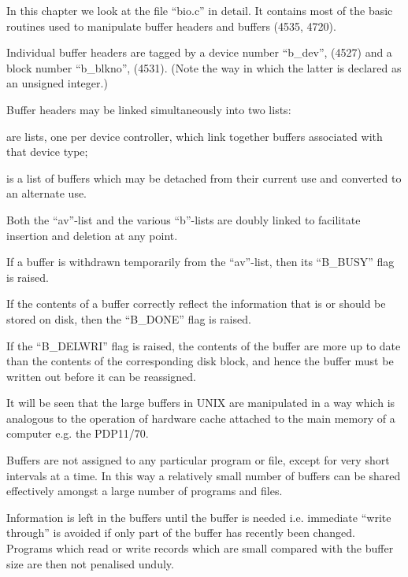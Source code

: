 %
%

In this chapter we look at the file
``bio.c'' in detail. It contains most of
the basic routines used to manipulate
buffer headers and buffers (4535,
4720).


Individual buffer headers are tagged by
a device number ``b\_dev'', (4527) and a
block number ``b\_blkno'', (4531). (Note
the way in which the latter is declared
as an unsigned integer.)

Buffer headers may be linked simultaneously into two lists:

\bd
\item[the ``b''-lists] are lists, one per
device controller, which link
together buffers associated with
that device type;

\item[the ``av''-list] is a list of buffers
which may be detached from their
current use and converted to an
alternate use.
\ed

Both the ``av''-list and the various
``b''-lists are doubly linked to facilitate insertion and deletion at any
point.


If a buffer is withdrawn temporarily
from the ``av''-list, then its ``B\_BUSY''
flag is raised.

If the contents of a buffer correctly
reflect the information that is or
should be stored on disk, then the
``B\_DONE'' flag is raised.

If the ``B\_DELWRI'' flag is raised, the
contents of the buffer are more up to
date than the contents of the
corresponding disk block, and hence the
buffer must be written out before it
can be reassigned.



It will be seen that the large buffers
in UNIX are manipulated in a way which
is analogous to the operation of
hardware cache attached to the main
memory of a computer e.g. the PDP11/70.

Buffers are not assigned to any particular program or file, except for very
short intervals at a time. In this way
a relatively small number of buffers
can be shared effectively amongst a
large number of programs and files.

Information is left in the buffers
until the buffer is needed i.e. immediate ``write through'' is avoided if only
part of the buffer has recently been
changed. Programs which read or write
records which are small compared with
the buffer size are then not penalised
unduly.

